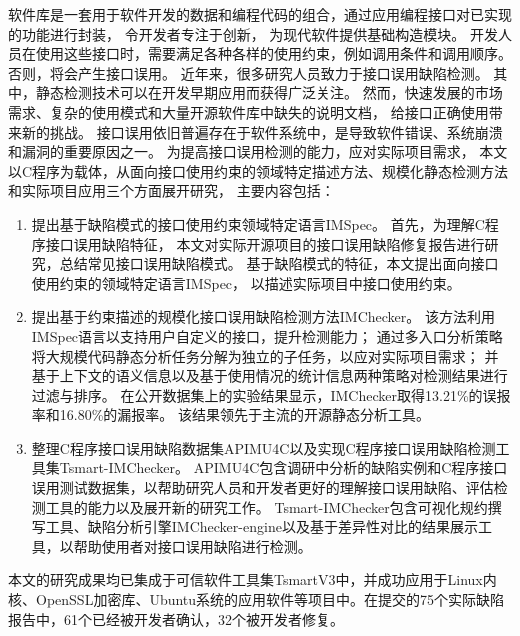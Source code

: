 \begin{cabstract}
  软件库是一套用于软件开发的数据和编程代码的组合，通过应用编程接口对已实现的功能进行封装，
  令开发者专注于创新，
  为现代软件提供基础构造模块。
  开发人员在使用这些接口时，需要满足各种各样的使用约束，例如调用条件和调用顺序。
  否则，将会产生接口误用。
  近年来，很多研究人员致力于接口误用缺陷检测。
  其中，静态检测技术可以在开发早期应用而获得广泛关注。
  然而，快速发展的市场需求、复杂的使用模式和大量开源软件库中缺失的说明文档，
  给接口正确使用带来新的挑战。
  接口误用依旧普遍存在于软件系统中，是导致软件错误、系统崩溃和漏洞的重要原因之一。
  为提高接口误用检测的能力，应对实际项目需求，
  本文以C程序为载体，从面向接口使用约束的领域特定描述方法、规模化静态检测方法和实际项目应用三个方面展开研究，
  主要内容包括：
  \begin{enumerate}
  	\item 提出基于缺陷模式的接口使用约束领域特定语言IMSpec。
  	首先，为理解C程序接口误用缺陷特征，
  	本文对实际开源项目的接口误用缺陷修复报告进行研究，总结常见接口误用缺陷模式。
  	基于缺陷模式的特征，本文提出面向接口使用约束的领域特定语言IMSpec，
  	以描述实际项目中接口使用约束。
  	\item 提出基于约束描述的规模化接口误用缺陷检测方法IMChecker。
  	该方法利用IMSpec语言以支持用户自定义的接口，提升检测能力；
  	通过多入口分析策略将大规模代码静态分析任务分解为独立的子任务，以应对实际项目需求；
  	并基于上下文的语义信息以及基于使用情况的统计信息两种策略对检测结果进行过滤与排序。
  	在公开数据集上的实验结果显示，IMChecker取得13.21\%的误报率和16.80\%的漏报率。
  	该结果领先于主流的开源静态分析工具。
  	\item 整理C程序接口误用缺陷数据集APIMU4C以及实现C程序接口误用缺陷检测工具集Tsmart-IMChecker。
  	APIMU4C包含调研中分析的缺陷实例和C程序接口误用测试数据集，以帮助研究人员和开发者更好的理解接口误用缺陷、评估检测工具的能力以及展开新的研究工作。
  	Tsmart-IMChecker包含可视化规约撰写工具、缺陷分析引擎IMChecker-engine以及基于差异性对比的结果展示工具，以帮助使用者对接口误用缺陷进行检测。
  \end{enumerate}
  
  本文的研究成果均已集成于可信软件工具集TsmartV3中，并成功应用于Linux内核、OpenSSL加密库、Ubuntu系统的应用软件等项目中。在提交的75个实际缺陷报告中，61个已经被开发者确认，32个被开发者修复。
  
\end{cabstract}


